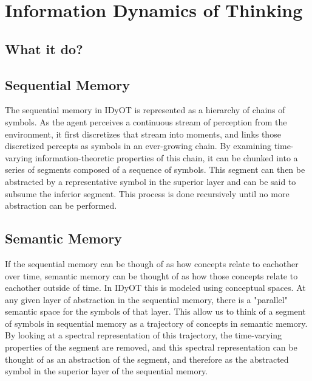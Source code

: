 \chapter{Information Dynamics of Thinking}

\section{What it do?}

\section{Sequential Memory}
The sequential memory in IDyOT is represented as a hierarchy of chains of symbols. As the agent perceives a continuous stream of perception from the environment, it first discretizes that stream into moments, and links those discretized percepts as symbols in an ever-growing chain.  By examining time-varying information-theoretic properties of this chain, it can be chunked into a series of segments composed of a sequence of symbols.  This segment can then be abstracted by a representative symbol in the superior layer and can be said to subsume the inferior segment.  This process is done recursively until no more abstraction can be performed.

\section{Semantic Memory}
If the sequential memory can be though of as how concepts relate to eachother over time, semantic memory can be thought of as how those concepts relate to eachother outside of time.  In IDyOT this is modeled using conceptual spaces.  At any given layer of abstraction in the sequential memory, there is a "parallel" semantic space for the symbols of that layer.  This allow us to think of a segment of symbols in sequential memory as a trajectory of concepts in semantic memory.  By looking at a spectral representation of this trajectory, the time-varying properties of the segment are removed, and this spectral representation can be thought of as an abstraction of the segment, and therefore as the abstracted symbol in the superior layer of the sequential memory.
